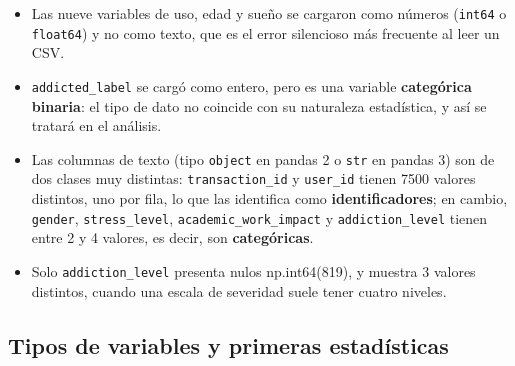 \documentclass[11pt,spanish,a4paper,]{article}
\providecommand{\tightlist}{%
  \setlength{\itemsep}{0pt}\setlength{\parskip}{0pt}}
\begin{document}
\begin{itemize}
\tightlist
\item
  Las nueve variables de uso, edad y sueño se cargaron como números
  (\texttt{int64} o \texttt{float64}) y no como texto, que es el error
  silencioso más frecuente al leer un CSV.
\item
  \texttt{addicted\_label} se cargó como entero, pero es una variable
  \textbf{categórica binaria}: el tipo de dato no coincide con su
  naturaleza estadística, y así se tratará en el análisis.
\item
  Las columnas de texto (tipo \texttt{object} en pandas 2 o \texttt{str}
  en pandas 3) son de dos clases muy distintas: \texttt{transaction\_id}
  y \texttt{user\_id} tienen 7500 valores distintos, uno por fila, lo
  que las identifica como \textbf{identificadores}; en cambio,
  \texttt{gender}, \texttt{stress\_level},
  \texttt{academic\_work\_impact} y \texttt{addiction\_level} tienen
  entre 2 y 4 valores, es decir, son \textbf{categóricas}.
\item
  Solo \texttt{addiction\_level} presenta nulos np.int64(819), y muestra
  3 valores distintos, cuando una escala de severidad suele tener cuatro
  niveles.
\end{itemize}

\subsection{Tipos de variables y primeras
estadísticas}\label{tipos-de-variables-y-primeras-estaduxedsticas}
\end{document}
